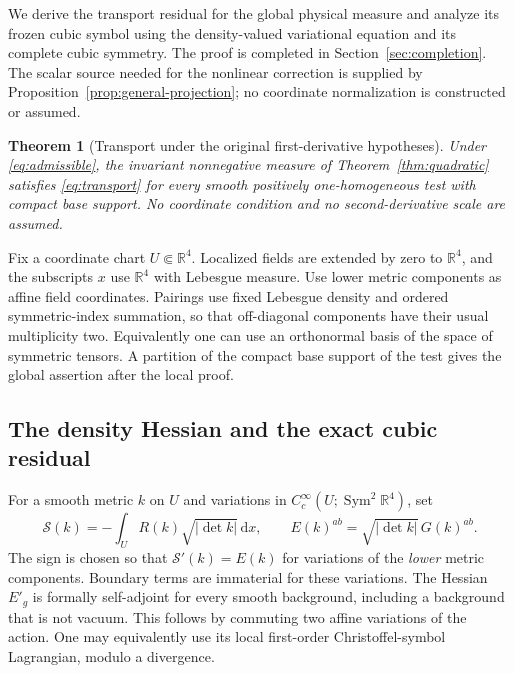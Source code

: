 \documentclass[11pt,a4paper]{article}
\numberwithin{equation}{section}
\newcommand{\dd}{\mathrm d}
\newcommand{\R}{\mathbb R}
\newtheorem{theorem}{Theorem}[section]
\theoremstyle{definition}
\begin{document}
We derive the transport residual for the global physical measure and
analyze its frozen cubic symbol using the density-valued variational
equation and its complete cubic symmetry. The proof is completed in Section~\ref{sec:completion}. The scalar source needed for the nonlinear
correction is supplied by Proposition~\ref{prop:general-projection}; no
coordinate normalization is constructed or assumed.

\begin{theorem}[Transport under the original first-derivative hypotheses]
\label{thm:variational-transport}
Under \eqref{eq:admissible}, the invariant nonnegative measure of
Theorem~\ref{thm:quadratic} satisfies \eqref{eq:transport} for every smooth
positively one-homogeneous test with compact base support. 
No coordinate condition and no second-derivative scale are assumed.
\end{theorem}

Fix a coordinate chart $U\Subset\R^4$. Localized fields are extended
by zero to $\R^4$, and the subscripts $x$ use $\R^4$ with Lebesgue measure. Use lower metric
components as affine field coordinates. Pairings use fixed Lebesgue density
and ordered symmetric-index summation, so that off-diagonal components have
their usual multiplicity two. Equivalently one can use an orthonormal basis
of the space of symmetric tensors. A partition of the compact base support
of the test gives the global assertion after the local proof.

\subsection{The density Hessian and the exact cubic residual}

For a smooth metric $k$ on $U$ and variations in
$C_c^\infty(U;\operatorname{Sym}^2\R^4)$, set
\begin{equation*}
\mathcal S(k)=-\int_U R(k)\sqrt{|\det k|}\,\dd x,\qquad
E(k)^{ab}=\sqrt{|\det k|}\,G(k)^{ab}.
\end{equation*}
The sign is chosen so that $\mathcal S'(k)=E(k)$ for variations of the
\emph{lower} metric components. Boundary terms are immaterial for these
variations. The Hessian $E'_g$ is formally self-adjoint for every smooth
background, including a background that is not vacuum. This follows by
commuting two affine variations of the action. One may equivalently use
its local first-order Christoffel-symbol Lagrangian, modulo a divergence.
\end{document}
